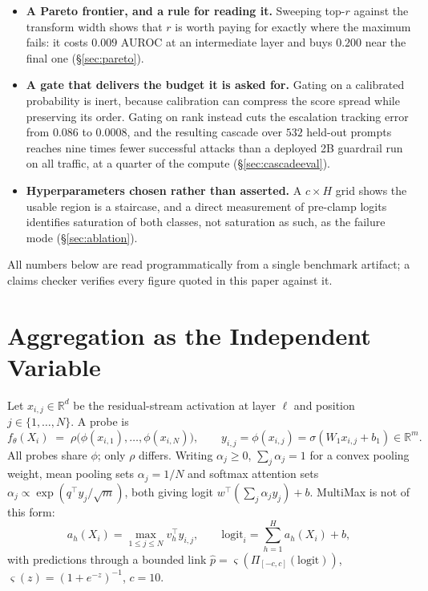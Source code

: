 \documentclass[10pt]{article}
\theoremstyle{plain}
\theoremstyle{definition}
\theoremstyle{remark}
\newcommand{\R}{\mathbb{R}}
\begin{document}
\begin{itemize}
  \item \textbf{A Pareto frontier, and a rule for reading it.} Sweeping top-$r$ against the
  transform width shows that $r$ is worth paying for exactly where the maximum fails:
  it costs $0.009$ AUROC at an intermediate layer and buys $0.200$ near the final one
  (\S\ref{sec:pareto}).
  \item \textbf{A gate that delivers the budget it is asked for.} Gating on a calibrated
  probability is inert, because calibration can compress the score spread while preserving
  its order. Gating on rank instead cuts the escalation tracking error from $0.086$ to
  $0.0008$, and the resulting cascade over $532$ held-out prompts reaches nine times fewer
  successful attacks than a deployed 2B guardrail run on all traffic, at a quarter of the
  compute (\S\ref{sec:cascadeeval}).
  \item \textbf{Hyperparameters chosen rather than asserted.} A $c\times H$ grid shows the
  usable region is a staircase, and a direct measurement of pre-clamp logits identifies
  saturation of both classes, not saturation as such, as the failure mode
  (\S\ref{sec:ablation}).
\end{itemize}

All numbers below are read programmatically from a single benchmark artifact; a claims
checker verifies every figure quoted in this paper against it.

\section{Aggregation as the Independent Variable}
\label{sec:agg}
Let $x_{i,j}\in\R^{d}$ be the residual-stream activation at layer $\ell$ and position
$j\in\{1,\dots,N\}$. A probe is
\begin{equation}
  f_\theta(X_i)\;=\;\rho\big(\phi(x_{i,1}),\dots,\phi(x_{i,N})\big),
  \qquad y_{i,j}=\phi(x_{i,j})=\sigma(W_1x_{i,j}+b_1)\in\R^m .
  \label{eq:probe}
\end{equation}
All probes share $\phi$; only $\rho$ differs. Writing $\alpha_j\ge0$, $\sum_j\alpha_j=1$
for a convex pooling weight, mean pooling sets $\alpha_j=1/N$ and softmax attention
\citep{vaswani2017attention} sets
$\alpha_j\propto\exp(q^\top y_j/\sqrt m)$, both giving logit
$w^\top(\sum_j\alpha_jy_j)+b$. MultiMax is not of this form:
\begin{equation}
  \boxed{\;a_h(X_i)=\max_{1\le j\le N} v_h^\top y_{i,j},
  \qquad \mathrm{logit}_i=\sum_{h=1}^{H}a_h(X_i)+b,\;}
  \label{eq:multimax}
\end{equation}
with predictions through a bounded link $\hat p=\varsigma(\Pi_{[-c,c]}(\mathrm{logit}))$,
$\varsigma(z)=(1+e^{-z})^{-1}$, $c=10$.
\end{document}
